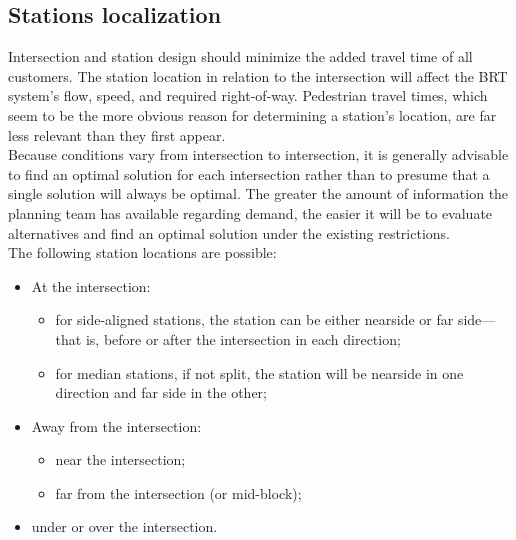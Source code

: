 \documentclass{article}
\begin{document}
\subsection{Stations localization}
Intersection and station design should minimize the added travel time of all customers. The station location in relation to the intersection will affect the BRT system’s flow, speed, and required right-of-way. Pedestrian travel times, which seem to be the more obvious reason for determining a station’s location, are far less relevant than they first appear.\\
Because conditions vary from intersection to intersection, it is generally advisable to find an optimal solution for each intersection rather than to presume that a single solution will always be optimal. The greater the amount of information the planning team has available regarding demand, the easier it will be to evaluate alternatives and find an optimal solution under the existing restrictions.\\
The following station locations are possible: 
\begin{itemize}
\item At the intersection:
\begin{itemize}
\item for side-aligned stations, the station can be either nearside or far side—that is, before or after the intersection in each direction; 
\item for median stations, if not split, the station will be nearside in one direction and far side in the other;
\end{itemize}
\item Away from the intersection:
\begin{itemize}
\item near the intersection; 
\item far from the intersection (or mid-block); 
\end{itemize}
\item under or over the intersection.
\end{itemize}
\end{document}
